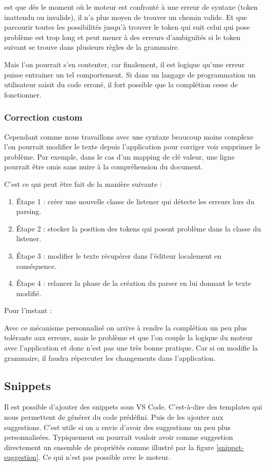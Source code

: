\documentclass[
    iict, %
    il, %
]{heig-tb}
\begin{document}
est que dès le moment où le moteur est confronté à une erreur de syntaxe (token inattendu ou invalide), il n'a plus moyen de trouver un chemin valide.
Et que parcourir toutes les possibilités jusqu'à trouver le token qui suit celui qui pose problème est trop long et peut mener à des erreurs d'ambiguïtés si le token suivant se trouve dans plusieurs règles de la grammaire.

Mais l'on pourrait s'en contenter, car finalement, il est logique qu'une erreur puisse entrainer un tel comportement.
Si dans un langage de programmation un utilisateur saisit du code erroné, il fort possible que la complétion cesse de fonctionner.

\subsubsection{Correction custom}
Cependant comme nous travaillons avec une syntaxe beaucoup moins complexe l'on pourrait modifier le texte depuis l'application pour corriger voir supprimer le problème.
Par exemple, dans le cas d'un mapping de clé valeur, une ligne pourrait être omis sans nuire à la compréhension du document.

C'est ce qui peut être fait de la manière suivante :
\begin{enumerate}
    \item Étape 1 : créer une nouvelle classe de listener qui détecte les erreurs lors du parsing.
    \item Étape 2 : stocker la position des tokens qui posent problème dans la classe du listener.
    \item Étape 3 : modifier le texte récupérer dans l'éditeur localement en conséquence.
    \item Étape 4 : relancer la phase de la création du parser en lui donnant le texte modifié.
\end{enumerate}

Pour l'instant : %

Avec ce mécanisme personnalisé on arrive à rendre la complétion un peu plus tolérante aux erreurs, mais le problème et que l'on couple la logique du moteur avec l'application et donc n'est pas une très bonne pratique.
Car si on modifie la grammaire, il faudra répercuter les changements dans l'application.

\subsection{Snippets}
Il est possible d'ajouter des snippets sous VS Code. C'est-à-dire des templates qui nous permettent de générer du code prédéfini. Puis de les ajouter aux suggestions.
C'est utile si on a envie d'avoir des suggestions un peu plus personnalisées.
Typiquement on pourrait vouloir avoir comme suggestion directement un ensemble de propriétés comme illustré par la figure \ref*{snippet-suggestion}.
Ce qui n'est pas possible avec le moteur.
\end{document}
